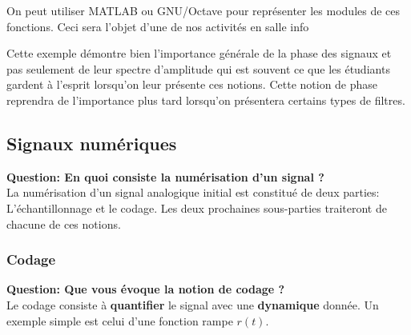 \documentclass[11pt,a4paper]{article}
\begin{document}
On peut utiliser MATLAB ou GNU/Octave pour représenter les modules de ces fonctions. Ceci sera l'objet d'une de nos activités en salle info



\begin{center}
\end{center}

Cette exemple démontre bien l'importance générale de la phase des signaux et pas seulement de leur spectre d'amplitude qui est souvent ce que les étudiants gardent à l'esprit lorsqu'on leur présente ces notions. Cette notion de phase reprendra de l'importance plus tard lorsqu'on présentera certains types de filtres.

\subsection{Signaux numériques}

\textbf{Question: En quoi consiste la numérisation d'un signal ?} \\

La numérisation d'un signal analogique initial est constitué de deux parties: L'échantillonnage et le codage. Les deux prochaines sous-parties traiteront de chacune de ces notions.

\subsubsection{Codage}

\textbf{Question: Que vous évoque la notion de codage ?} \\

Le codage consiste à \textbf{quantifier} le signal avec une \textbf{dynamique} donnée. Un exemple simple est celui d'une fonction rampe $r(t)$.\\
\end{document}
